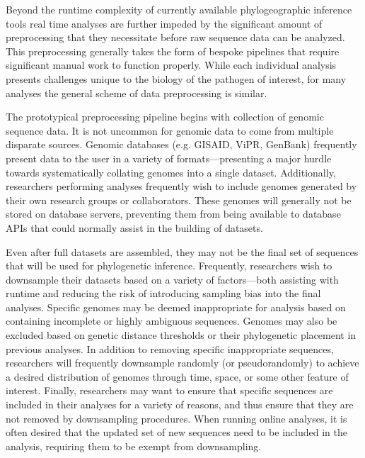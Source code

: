 Beyond the runtime complexity of currently available phylogeographic inference tools real time analyses are further impeded by the significant amount of preprocessing that they necessitate before raw sequence data can be analyzed.
This preprocessing generally takes the form of bespoke pipelines that require significant manual work to function properly.
While each individual analysis presents challenges unique to the biology of the pathogen of interest, for many analyses the general scheme of data preprocessing is similar.

The prototypical preprocessing pipeline begins with collection of genomic sequence data.
It is not uncommon for genomic data to come from multiple disparate sources.
Genomic databases (e.g. GISAID, ViPR, GenBank) frequently present data to the user in a variety of formats---presenting a major hurdle towards systematically collating genomes into a single dataset.
Additionally, researchers performing analyses frequently wish to include genomes generated by their own research groups or collaborators.
These genomes will generally not be stored on database servers, preventing them from being available to database APIs that could normally assist in the building of datasets.

Even after full datasets are assembled, they may not be the final set of sequences that will be used for phylogenetic inference.
Frequently, researchers wish to downsample their datasets based on a variety of factors---both assisting with runtime and reducing the risk of introducing sampling bias into the final analyses.
Specific genomes may be deemed inappropriate for analysis based on containing incomplete or highly ambiguous sequences.
Genomes may also be excluded based on genetic distance thresholds or their phylogenetic placement in previous analyses.
In addition to removing specific inappropriate sequences, researchers will frequently downsample randomly (or pseudorandomly) to achieve a desired distribution of genomes through time, space, or some other feature of interest.
Finally, researchers may want to ensure that specific sequences are included in their analyses for a variety of reasons, and thus ensure that they are not removed by downsampling procedures.
When running online analyses, it is often desired that the updated set of new sequences need to be included in the analysis, requiring them to be exempt from downsampling.

